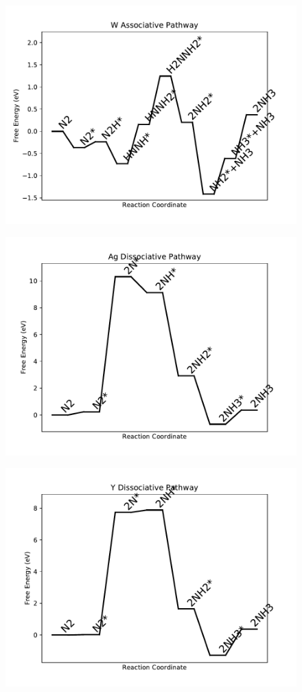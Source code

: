 \begin{figure}
\centering
\includegraphics[width=0.8\linewidth]{data/plots/W_associative.pdf}
\end{figure}

\begin{figure}
\centering
\includegraphics[width=0.8\linewidth]{data/plots/Ag_dissociative.pdf}
\end{figure}

\begin{figure}
\centering
\includegraphics[width=0.8\linewidth]{data/plots/Y_dissociative.pdf}
\end{figure}

